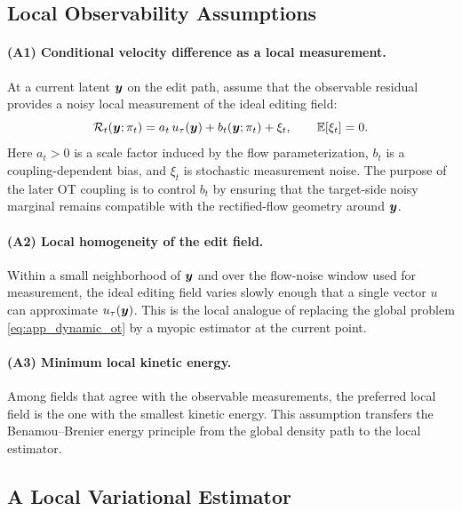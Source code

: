 \subsection{Local Observability Assumptions}

\paragraph{(A1) Conditional velocity difference as a local measurement.}
At a current latent $\boldsymbol{y}$ on the edit path, assume that the observable residual provides a noisy local measurement of the ideal editing field:
\begin{equation}
    \label{eq:app_measurement_model}
    \mathcal{R}_t(\boldsymbol{y};\pi_t)
    =
    a_t\,u_\tau(\boldsymbol{y})
    +
    b_t(\boldsymbol{y};\pi_t)
    +
    \xi_t,
    \qquad
    \mathbb{E}[\xi_t]=0.
\end{equation}
Here $a_t>0$ is a scale factor induced by the flow parameterization, $b_t$ is a coupling-dependent bias, and $\xi_t$ is stochastic measurement noise.
The purpose of the later OT coupling is to control $b_t$ by ensuring that the target-side noisy marginal remains compatible with the rectified-flow geometry around $\boldsymbol{y}$.

\paragraph{(A2) Local homogeneity of the edit field.}
Within a small neighborhood of $\boldsymbol{y}$ and over the flow-noise window used for measurement, the ideal editing field varies slowly enough that a single vector $u$ can approximate $u_\tau(\boldsymbol{y})$.
This is the local analogue of replacing the global problem \eqref{eq:app_dynamic_ot} by a myopic estimator at the current point.

\paragraph{(A3) Minimum local kinetic energy.}
Among fields that agree with the observable measurements, the preferred local field is the one with the smallest kinetic energy.
This assumption transfers the Benamou--Brenier energy principle from the global density path to the local estimator.

\subsection{A Local Variational Estimator}

